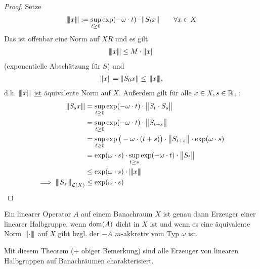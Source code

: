 \begin{proof}
Setze
\begin{align*}
\Vertiii{x}:=\sup\limits_{t\geq0}\exp(-\omega\cdot t)\cdot\Vert S_t x\Vert\qquad\forall x\in X
\end{align*}
Das ist offenbar eine Norm auf $XR$ und es gilt 
\begin{align*}
\Vertiii{x}\leq M\cdot\Vert x\Vert
\end{align*}
(exponentielle Abschätzung für $S$) und 
\begin{align*}
\Vert x\Vert=\Vert S_0 x\Vert\leq\Vertiii{x},
\end{align*}
d.h. $\Vertiii{x}$ \underline{ist} äquivalente Norm auf $X$. Außerdem gilt für alle $x\in X, s\in\R_+$:
\begin{align*}
\Vertiii{S_s x}
&=\sup\limits_{t\geq0}\exp(-\omega\cdot t)\cdot\big\Vert S_t\cdot S_s\big\Vert\\
&=\sup\limits_{t\geq0}\exp(-\omega\cdot t)\cdot\big\Vert S_{t+s}\big\Vert\\
&=\sup\limits_{t\geq0}\exp\big(-\omega\cdot(t+s)\big)\cdot\big\Vert S_{t+s}\big\Vert\cdot\exp(\omega\cdot s)\\
&=\exp(\omega\cdot s)\cdot\sup\limits_{t\geq s}\exp(-\omega\cdot t)\cdot\big\Vert S_{t}\big\Vert\\\
&\leq\exp(\omega\cdot s)\cdot\Vertiii{x}\\
\implies \Vertiii{S_s}_{\L(X)}&\leq\exp(\omega\cdot s)
\end{align*}
\end{proof}

\begin{theorem}[Ohne Namen]\enter
Ein linearer Operator $A$ auf einem Banachraum $X$ ist genau dann Erzeuger einer linearer Halbgruppe, wenn $\dom(A)$ dicht in $X$ ist und wenn es eine äquivalente Norm $\Vertiii{\cdot}$ auf $X$ gibt bzgl. der $-A$ $m$-akkretiv vom Typ $\omega$ ist.
\end{theorem}

Mit diesem Theorem (+ obiger Bemerkung) sind alle Erzeuger von linearen Halbgruppen auf Banachräumen charakterisiert.

